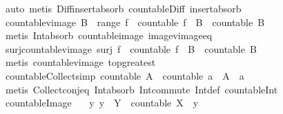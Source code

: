 \begin{isabellebody}
%
\isatagproof
{}\isamarkupfalse%
\ auto\ {\isacharparenleft}metis\ Diff{\isacharunderscore}insert{\isacharunderscore}absorb\ countable{\isacharunderscore}Diff\ insert{\isacharunderscore}absorb{\isacharparenright}%
\endisatagproof
{\isafoldproof}%
%
\isadelimproof
\isanewline
%
\endisadelimproof
\isanewline
{}\isamarkupfalse%
\ countable{\isacharunderscore}vimage{\isacharcolon}\ {\isachardoublequoteopen}B\ {\isasymsubseteq}\ range\ f\ {\isasymLongrightarrow}\ countable\ {\isacharparenleft}f\ {\isacharminus}{\isacharbackquote}\ B{\isacharparenright}\ {\isasymLongrightarrow}\ countable\ B{\isachardoublequoteclose}\isanewline
%
\isadelimproof
\ \ %
\endisadelimproof
%
\isatagproof
{}\isamarkupfalse%
\ {\isacharparenleft}metis\ Int{\isacharunderscore}absorb{}\ countable{\isacharunderscore}image\ image{\isacharunderscore}vimage{\isacharunderscore}eq{\isacharparenright}%
\endisatagproof
{\isafoldproof}%
%
\isadelimproof
\isanewline
%
\endisadelimproof
\isanewline
{}\isamarkupfalse%
\ surj{\isacharunderscore}countable{\isacharunderscore}vimage{\isacharcolon}\ {\isachardoublequoteopen}surj\ f\ {\isasymLongrightarrow}\ countable\ {\isacharparenleft}f\ {\isacharminus}{\isacharbackquote}\ B{\isacharparenright}\ {\isasymLongrightarrow}\ countable\ B{\isachardoublequoteclose}\isanewline
%
\isadelimproof
\ \ %
\endisadelimproof
%
\isatagproof
{}\isamarkupfalse%
\ {\isacharparenleft}metis\ countable{\isacharunderscore}vimage\ top{\isacharunderscore}greatest{\isacharparenright}%
\endisatagproof
{\isafoldproof}%
%
\isadelimproof
\isanewline
%
\endisadelimproof
\isanewline
{}\isamarkupfalse%
\ countable{\isacharunderscore}Collect{\isacharbrackleft}simp{\isacharbrackright}{\isacharcolon}\ {\isachardoublequoteopen}countable\ A\ {\isasymLongrightarrow}\ countable\ {\isacharbraceleft}a\ {\isasymin}\ A{\isachardot}\ {\isasymphi}\ a{\isacharbraceright}{\isachardoublequoteclose}\isanewline
%
\isadelimproof
\ \ %
\endisadelimproof
%
\isatagproof
{}\isamarkupfalse%
\ {\isacharparenleft}metis\ Collect{\isacharunderscore}conj{\isacharunderscore}eq\ Int{\isacharunderscore}absorb\ Int{\isacharunderscore}commute\ Int{\isacharunderscore}def\ countable{\isacharunderscore}Int{}{\isacharparenright}%
\endisatagproof
{\isafoldproof}%
%
\isadelimproof
\isanewline
%
\endisadelimproof
\isanewline
{}\isamarkupfalse%
\ countable{\isacharunderscore}Image{\isacharcolon}\isanewline
\ \ \ {\isachardoublequoteopen}{\isasymAnd}y{\isachardot}\ y\ {\isasymin}\ Y\ {\isasymLongrightarrow}\ countable\ {\isacharparenleft}X\ {\isacharbackquote}{\isacharbackquote}\ {\isacharbraceleft}y{\isacharbraceright}{\isacharparenright}{\isachardoublequoteclose}\isanewline

\end{isabellebody}
